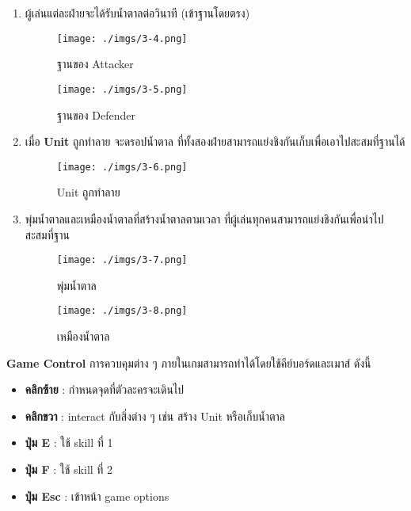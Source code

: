 \documentclass[12pt,oneside,openright,a4paper]{cpe-thai-project}
\begin{document}
\begin{enumerate}
  \item ผู้เล่นแต่ละฝ่ายจะได้รับน้ำตาลต่อวินาที (เข้าฐานโดยตรง)
  \begin{figure}[H]\centering
    \begin{minipage}{.3\textwidth}
      \centering
      \texttt{[image: ./imgs/3-4.png]}
      \caption{ฐานของ Attacker}\label{fig:3-4}
    \end{minipage}
    \begin{minipage}{.3\textwidth}
      \centering
      \texttt{[image: ./imgs/3-5.png]}
      \caption{ฐานของ Defender}\label{fig:3-5}
    \end{minipage}
  \end{figure}

  \item เมื่อ \textbf{Unit} ถูกทำลาย จะดรอปน้ำตาล
  ที่ทั้งสองฝ่ายสามารถแย่งชิงกันเก็บเพื่อเอาไปสะสมที่ฐานได้
  \begin{figure}[H]\centering
    \texttt{[image: ./imgs/3-6.png]}
    \caption{Unit ถูกทำลาย}\label{fig:3-6}
  \end{figure}

  \item พุ่มน้ำตาลและเหมืองน้ำตาลที่สร้างน้ำตาลตามเวลา 
  ที่ผู้เล่นทุกคนสามารถแย่งชิงกันเพื่อนำไปสะสมที่ฐาน
  \begin{figure}[H]\centering
    \begin{minipage}{.3\textwidth}
      \centering
      \texttt{[image: ./imgs/3-7.png]}
      \caption{พุ่มน้ำตาล}\label{fig:3-7}
    \end{minipage}
    \begin{minipage}{.3\textwidth}
      \centering
      \texttt{[image: ./imgs/3-8.png]}
      \caption{เหมืองน้ำตาล}\label{fig:3-8}
    \end{minipage}
  \end{figure}
\end{enumerate}

\pagebreak
\textbf{Game Control}
การควบคุมต่าง ๆ ภายในเกมสามารถทำได้โดยใช้คีย์บอร์ดและเมาส์ ดังนี้
\begin{itemize}
  \item \textbf{คลิกซ้าย} : กำหนดจุดที่ตัวละครจะเดินไป
  \item \textbf{คลิกขวา} : interact กับสิ่งต่าง ๆ เช่น สร้าง Unit หรือเก็บน้ำตาล 
  \item \textbf{ปุ่ม E} : ใช้ skill ที่ 1
  \item \textbf{ปุ่ม F} : ใช้ skill ที่ 2
  \item \textbf{ปุ่ม Esc} : เข้าหน้า game options
  
\end{itemize}
\end{document}
